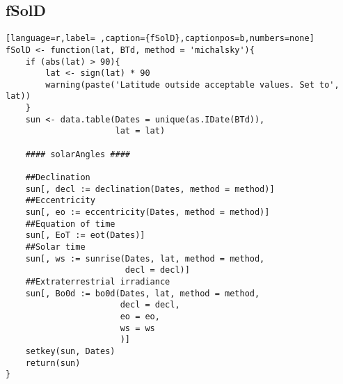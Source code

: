 \subsection{fSolD}
\label{sec:org679f720}
\label{subsec:fsold}
\begin{lstlisting}[language=r,label= ,caption={fSolD},captionpos=b,numbers=none]
fSolD <- function(lat, BTd, method = 'michalsky'){
    if (abs(lat) > 90){
        lat <- sign(lat) * 90
        warning(paste('Latitude outside acceptable values. Set to', lat))
    }
    sun <- data.table(Dates = unique(as.IDate(BTd)),
                      lat = lat)

    #### solarAngles ####

    ##Declination
    sun[, decl := declination(Dates, method = method)]
    ##Eccentricity
    sun[, eo := eccentricity(Dates, method = method)]
    ##Equation of time
    sun[, EoT := eot(Dates)]
    ##Solar time
    sun[, ws := sunrise(Dates, lat, method = method,
                        decl = decl)]
    ##Extraterrestrial irradiance
    sun[, Bo0d := bo0d(Dates, lat, method = method,
                       decl = decl,
                       eo = eo,
                       ws = ws
                       )]
    setkey(sun, Dates)
    return(sun)
}
\end{lstlisting}
